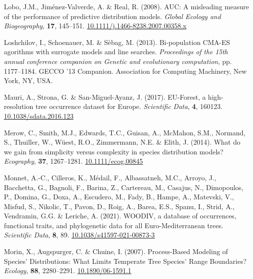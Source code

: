 \documentclass[11pt,]{article}
\newlength{\cslhangindent}
\newenvironment{CSLReferences}[2] %
 {%
  \setlength{\parindent}{0pt}
  \ifodd #1 \everypar{\setlength{\hangindent}{\cslhangindent}}\ignorespaces\fi
  \ifnum #2 > 0
  \setlength{\parskip}{#2\baselineskip}
  \fi
 }%
 {}
\begin{document}
\begin{CSLReferences}{1}{0}
\leavevmode{}%
Lobo, J.M., Jiménez-Valverde, A. \& Real, R. (2008). {AUC}: A misleading
measure of the performance of predictive distribution models.
\emph{Global Ecology and Biogeography}, \textbf{17}, 145--151.
\href{https://doi.org/10.1111/j.1466-8238.2007.00358.x}{10.1111/j.1466-8238.2007.00358.x}

\leavevmode{}%
Loshchilov, I., Schoenauer, M. \& Sèbag, M. (2013). Bi-population
{CMA}-{ES} agorithms with surrogate models and line searches.
\emph{Proceedings of the 15th annual conference companion on {Genetic}
and evolutionary computation}, pp. 1177--1184. {GECCO} '13 {Companion}.
Association for Computing Machinery, New York, NY, USA.

\leavevmode{}%
Mauri, A., Strona, G. \& San-Miguel-Ayanz, J. (2017). {EU}-{Forest}, a
high-resolution tree occurrence dataset for {Europe}. \emph{Scientific
Data}, \textbf{4}, 160123.
\href{https://doi.org/10.1038/sdata.2016.123}{10.1038/sdata.2016.123}

\leavevmode{}%
Merow, C., Smith, M.J., Edwards, T.C., Guisan, A., McMahon, S.M.,
Normand, S., Thuiller, W., Wüest, R.O., Zimmermann, N.E. \& Elith, J.
(2014). What do we gain from simplicity versus complexity in species
distribution models? \emph{Ecography}, \textbf{37}, 1267--1281.
\href{https://doi.org/10.1111/ecog.00845}{10.1111/ecog.00845}

\leavevmode{}%
Monnet, A.-C., Cilleros, K., Médail, F., Albassatneh, M.C., Arroyo, J.,
Bacchetta, G., Bagnoli, F., Barina, Z., Cartereau, M., Casajus, N.,
Dimopoulos, P., Domina, G., Doxa, A., Escudero, M., Fady, B., Hampe, A.,
Matevski, V., Misfud, S., Nikolic, T., Pavon, D., Roig, A., Barea, E.S.,
Spanu, I., Strid, A., Vendramin, G.G. \& Leriche, A. (2021). {WOODIV}, a
database of occurrences, functional traits, and phylogenetic data for
all {Euro}-{Mediterranean} trees. \emph{Scientific Data}, \textbf{8},
89.
\href{https://doi.org/10.1038/s41597-021-00873-3}{10.1038/s41597-021-00873-3}

\leavevmode{}%
Morin, X., Augspurger, C. \& Chuine, I. (2007). Process-{Based}
{Modeling} of {Species}' {Distributions}: {What} {Limits} {Temperate}
{Tree} {Species}' {Range} {Boundaries}? \emph{Ecology}, \textbf{88},
2280--2291. \href{https://doi.org/10.1890/06-1591.1}{10.1890/06-1591.1}


\end{CSLReferences}
\end{document}
